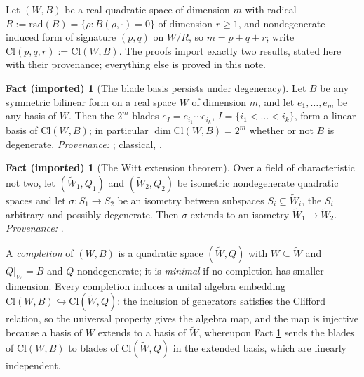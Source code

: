 \documentclass[11pt]{article}
\theoremstyle{definition}
\newtheorem{fact}[theorem]{Fact (imported)}
\newcommand{\Cl}{\mathrm{Cl}}
\newcommand{\rad}{\mathrm{rad}}
\begin{document}
Let $(W, B)$ be a real quadratic space of dimension $m$ with radical $R := \rad(B) = \{\rho : B(\rho, \cdot) = 0\}$ of dimension $r \geq 1$, and nondegenerate induced form of signature $(p,q)$ on $W/R$, so $m = p + q + r$; write $\Cl(p,q,r) := \Cl(W,B)$. The proofs import exactly two results, stated here with their provenance; everything else is proved in this note.

\begin{fact}[The blade basis persists under degeneracy]\label{fact:blades}
Let $B$ be any symmetric bilinear form on a real space $W$ of dimension $m$, and let $e_1, \dots, e_m$ be any basis of $W$. Then the $2^m$ blades $e_I = e_{i_1} \cdots e_{i_k}$, $I = \{i_1 < \dots < i_k\}$, form a linear basis of $\Cl(W, B)$; in particular $\dim \Cl(W,B) = 2^m$ whether or not $B$ is degenerate. \emph{Provenance:} \cite[Lem.~2.6]{ButlerT4}; classical, \cite{Chevalley1997}.
\end{fact}

\begin{fact}[The Witt extension theorem]\label{fact:witt}
Over a field of characteristic not two, let $(\widetilde W_1, Q_1)$ and $(\widetilde W_2, Q_2)$ be isometric nondegenerate quadratic spaces and let $\sigma : S_1 \to S_2$ be an isometry between subspaces $S_i \subseteq \widetilde W_i$, the $S_i$ arbitrary and possibly degenerate. Then $\sigma$ extends to an isometry $\widetilde W_1 \to \widetilde W_2$. \emph{Provenance:} \cite[Ch.~I, Thm.~4.7]{Lam2005}.
\end{fact}

A \emph{completion} of $(W,B)$ is a quadratic space $(\widetilde W, Q)$ with $W \subseteq \widetilde W$ and $Q|_W = B$ and $Q$ nondegenerate; it is \emph{minimal} if no completion has smaller dimension. Every completion induces a unital algebra embedding $\Cl(W,B) \hookrightarrow \Cl(\widetilde W, Q)$: the inclusion of generators satisfies the Clifford relation, so the universal property gives the algebra map, and the map is injective because a basis of $W$ extends to a basis of $\widetilde W$, whereupon Fact \ref{fact:blades} sends the blades of $\Cl(W,B)$ to blades of $\Cl(\widetilde W, Q)$ in the extended basis, which are linearly independent.
\end{document}
